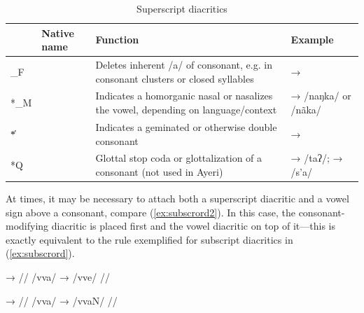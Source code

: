 \begin{table}[tp]
\caption{Superscript diacritics}
\begin{tabu} to 
\toprule
\tableheaderfont

	& Native name
	& Function
	& Example
	\\
	
\toprule

*\_F
	& 
	& Deletes inherent /a/ of consonant, e.g. in consonant clusters or 
		closed syllables
	&  → 
	\\
	
\midrule

*\_M
	& 
	& Indicates a homorganic nasal or nasalizes the vowel, depending on 
		language/context
	&  →  /naŋka/ or /nãka/
	\\
	
\midrule

*̔
	& 
	& Indicates a geminated or otherwise double consonant
	&  → 
	\\
	
\midrule

*Q
	& 
	& Glottal stop coda or glottalization of a consonant (not used in Ayeri)
	&  →  /taʔ/;\newline
		 →  /s’a/
	\\

\bottomrule
\end{tabu}
\label{tab:thdiatop}
\end{table}

At times, it may be necessary to attach both a superscript diacritic and a
vowel sign above a consonant, compare (\ref{ex:subscrord2}). In this case, the
consonant-modifying diacritic is placed first and the vowel diacritic on top of
it---this is exactly equivalent to the rule exemplified for subscript
diacritics in (\ref{ex:subscrord}).

\pex[lingstyle=thex]\label{ex:subscrord2}
\a\begingl
	\gla {}	→	 //
	\glb /vva/	→	/vve/ //
\endgl

\a\begingl
	\gla {}	→	 //
	\glb /vva/	→	/vvaN/ //
\endgl
\xe


